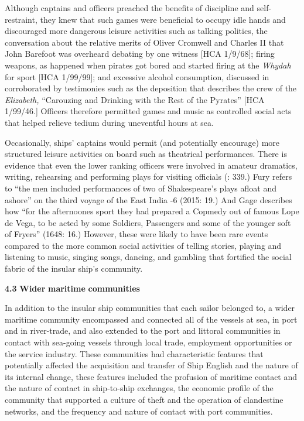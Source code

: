 Although captains and officers preached the benefits of discipline and self-restraint, they knew that such games were beneficial to occupy idle hands and discouraged more dangerous leisure activities such as talking politics, the conversation about the relative merits of Oliver Cromwell and Charles II that John Barefoot was overheard debating by one witness [HCA 1/9/68]; firing weapons, as happened when pirates got bored and started firing at the \textit{Whydah} for sport [HCA 1/99/99]; and excessive alcohol consumption, discussed in  corroborated by testimonies such as the deposition that describes the crew of the \textit{Elizabeth,} “Carouzing and Drinking with the Rest of the Pyrates” [HCA 1/99/46.] Officers therefore permitted games and music as controlled social acts that helped relieve tedium during uneventful hours at sea. 

Occasionally, ships’ captains would permit (and potentially encourage) more structured leisure activities on board such as theatrical performances. There is evidence that even the lower ranking officers were involved in amateur dramatics, writing, rehearsing and performing plays for visiting officials (\citealt{AdkinsAdkins2008}: 339.) Fury refers to “the men included performances of two of Shakespeare’s plays afloat and ashore” on the third voyage of the East India \citealt{Company1604}-6 (2015: 19.) And Gage describes how “for the afternoones sport they had prepared a Copmedy out of famous Lope de Vega, to be acted by some Soldiers, Passengers and some of the younger soft of Fryers” (1648: 16.) However, these were likely to have been rare events compared to the more common social activities of telling stories, playing and listening to music, singing songs, dancing, and gambling that fortified the social fabric of the insular ship’s community. 

\textbf{4.3} \textbf{Wider} \textbf{maritime} \textbf{communities}

In addition to the insular ship communities that each sailor belonged to, a wider maritime community encompassed and connected all of the vessels at sea, in port and in river-trade, and also extended to the port and littoral communities in contact with sea-going vessels through local trade, employment opportunities or the service industry. These communities had characteristic features that potentially affected the acquisition and transfer of Ship English and the nature of its internal change, these features included the profusion of maritime contact and the nature of contact in ship-to-ship exchanges, the economic profile of the community that supported a culture of theft and the operation of clandestine networks, and the frequency and nature of contact with port communities. 

